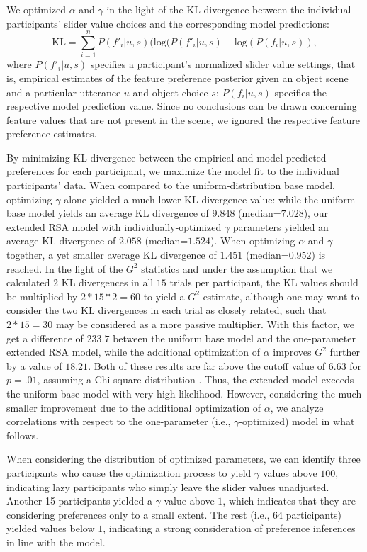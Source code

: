 \documentclass[10pt,a4paper]{article}
\begin{document}
We optimized $\alpha$ and $\gamma$ in the light of the KL divergence between the individual participants' slider value choices and the corresponding model predictions:
$$\textrm{KL} = \sum_{i=1}^{n} P(f'_i|u,s) (\textrm {log} (P(f'_i|u,s) - \textrm {log} (P(f_i|u,s)),$$
where $P(f'_i|u,s)$ specifies a participant's normalized slider value settings, that is, empirical estimates of the feature preference posterior given an object scene and a particular utterance $u$ and object choice $s$; $P(f_i|u,s)$ specifies the respective model prediction value.
Since no conclusions can be drawn concerning feature values that are not present in the scene, we ignored the respective feature preference estimates. 


By minimizing KL divergence between the empirical and model-predicted preferences for each participant, we maximize the model fit to the individual participants' data.
When compared to the uniform-distribution base model, optimizing $\gamma$ alone yielded a much lower KL divergence value: while the uniform base model yields an average KL divergence of $9.848$ (median=$7.028$), our extended RSA model with individually-optimized $\gamma$ parameters yielded an average KL divergence of $2.058$ (median=$1.524$). 
When optimizing $\alpha$ and $\gamma$ together, a yet smaller average KL divergence of $1.451$ (median=$0.952$) is reached.
In the light of the $G^2$ statistics and under the assumption that we calculated $2$ KL divergences in all $15$ trials per participant, the KL values should be multiplied by $2*15*2=60$ to yield a $G^2$ estimate, although one may want to consider the two KL divergences in each trial as closely related, such that $2*15=30$ may be considered as a more passive multiplier.
With this factor, we get a difference of $233.7$ between the uniform base model and the one-parameter extended RSA model, while the additional optimization of $\alpha$ improves $G^2$ further by a value of $18.21$. Both of these results are far above the cutoff value of $6.63$ for $p=.01$, assuming a Chi-square distribution \cite{Lewandowsky:2011}. 
Thus, the extended model exceeds the uniform base model with very high likelihood. 
However, considering the much smaller improvement due to the additional optimization of $\alpha$, we analyze correlations with respect to the one-parameter (i.e., $\gamma$-optimized) model in what follows. 

When considering the distribution of optimized parameters, we can identify three participants who cause the optimization process to yield $\gamma$ values above $100$, indicating lazy participants who simply leave the slider values unadjusted. 
Another 15 participants yielded a $\gamma$ value above $1$, which indicates that they are considering preferences only to a small extent. The rest (i.e., 64 participants) yielded values below $1$, indicating a strong consideration of preference inferences in line with the model. 
 
\end{document}
